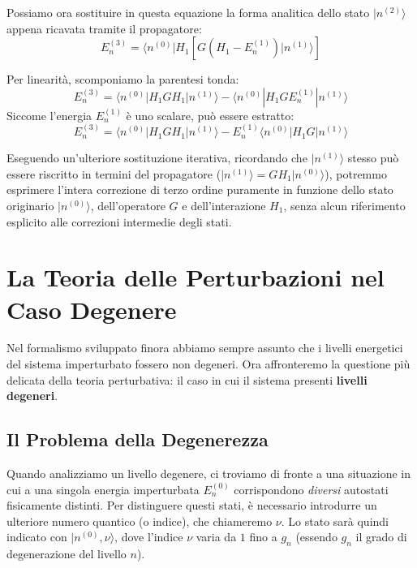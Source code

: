 Possiamo ora sostituire in questa equazione la forma analitica dello stato $\vert{}n^{(2)}\rangle$ appena ricavata tramite il propagatore:
\begin{equation}
E_n^{(3)} = \langle n^{(0)} | H_1 \left[ G (H_1 - E_n^{(1)}) |n^{(1)}\rangle \right]
\end{equation}

Per linearità, scomponiamo la parentesi tonda:
\begin{equation}
E_n^{(3)} = \langle n^{(0)} | H_1 G H_1 |n^{(1)}\rangle - \langle n^{(0)} | H_1 G E_n^{(1)} |n^{(1)}\rangle
\end{equation}
Siccome l'energia $E_n^{(1)}$ è uno scalare, può essere estratto:
\begin{equation}
E_n^{(3)} = \langle n^{(0)} | H_1 G H_1 |n^{(1)}\rangle - E_n^{(1)} \langle n^{(0)} | H_1 G |n^{(1)}\rangle
\end{equation}

Eseguendo un'ulteriore sostituzione iterativa, ricordando che $\vert{}n^{(1)}\rangle$ stesso può essere riscritto in termini del propagatore ($\vert{}n^{(1)}\rangle = G H_1 \vert{}n^{(0)}\rangle$), potremmo esprimere l'intera correzione di terzo ordine puramente in funzione dello stato originario $\vert{}n^{(0)}\rangle$, dell'operatore $G$ e dell'interazione $H_1$, senza alcun riferimento esplicito alle correzioni intermedie degli stati.

\section{La Teoria delle Perturbazioni nel Caso Degenere}

Nel formalismo sviluppato finora abbiamo sempre assunto che i livelli energetici del sistema imperturbato fossero non degeneri. Ora affronteremo la questione più delicata della teoria perturbativa: il caso in cui il sistema presenti \textbf{livelli degeneri}.

\subsection{Il Problema della Degenerezza}

Quando analizziamo un livello degenere, ci troviamo di fronte a una situazione in cui a una singola energia imperturbata $E_n^{(0)}$ corrispondono \textit{diversi} autostati fisicamente distinti. Per distinguere questi stati, è necessario introdurre un ulteriore numero quantico (o indice), che chiameremo $\nu$.
Lo stato sarà quindi indicato con $\vert{}n^{(0)}, \nu\rangle$, dove l'indice $\nu$ varia da $1$ fino a $g_n$ (essendo $g_n$ il grado di degenerazione del livello $n$).

